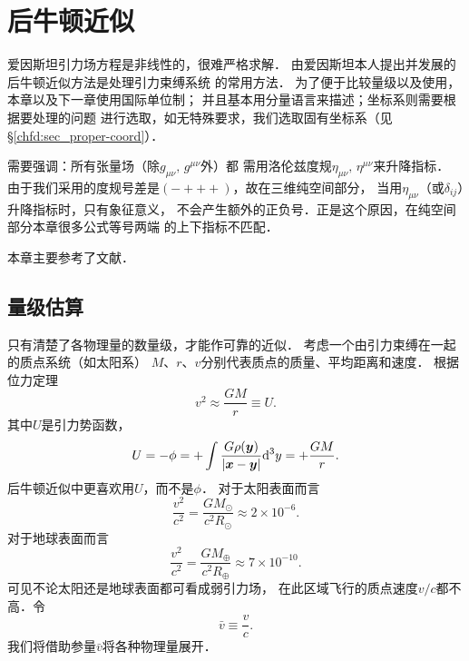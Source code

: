 
\chapter{后牛顿近似} \label{chppn}
爱因斯坦引力场方程是非线性的，很难严格求解．
由爱因斯坦本人提出并发展的后牛顿近似方法是处理引力束缚系统
的常用方法．
为了便于比较量级以及使用，本章以及下一章使用国际单位制；
并且基本用分量语言来描述；坐标系则需要根据要处理的问题
进行选取，如无特殊要求，我们选取固有坐标系（见\S\ref{chfd:sec_proper-coord}）．

需要强调：所有张量场（除$g_{\mu\nu},\, g^{\mu\nu}$外）都
需用洛伦兹度规$\eta_{\mu\nu},\, \eta^{\mu\nu}$来升降指标．
由于我们采用的度规号差是$(-+++)$，故在三维纯空间部分，
当用$\eta_{\mu\nu}$（或$\delta_{ij}$）升降指标时，只有象征意义，
不会产生额外的正负号．正是这个原因，在纯空间部分本章很多公式等号两端
的上下指标不匹配．

本章主要参考了文献\parencite[Ch. 9]{weinberg_grav-1972}．

\section{量级估算}
只有清楚了各物理量的数量级，才能作可靠的近似．
考虑一个由引力束缚在一起的质点系统（如太阳系）
$M$、$r$、$v$分别代表质点的质量、平均距离和速度．
根据位力定理
\begin{equation}
    v^2 \approx \frac{GM}{r} \equiv U .
\end{equation}
其中$U$是引力势函数，
\begin{equation}
    U = -\phi = +\int \frac{G \rho(\boldsymbol{y})}{|\boldsymbol{x}-\boldsymbol{y}|} {\rm d}^3y
      = +\frac{G M }{r} .
\end{equation}
后牛顿近似中更喜欢用$U$，而不是$\phi$．
对于太阳表面而言
\begin{equation}
    \frac{v^2}{c^2}=\frac{G M_{\odot} }{c^2 R_{\odot}} \approx 2 \times 10^{-6} .
\end{equation}
对于地球表面而言
\begin{equation}
    \frac{v^2}{c^2}=\frac{G M_{\oplus} }{c^2 R_{\oplus}} \approx 7 \times 10^{-10} .
\end{equation}
可见不论太阳还是地球表面都可看成弱引力场，
在此区域飞行的质点速度$v/c$都不高．令
\begin{equation}\label{chppn:eqn_vdc}
    \bar{v}\equiv \frac{v}{c}.
\end{equation}
我们将借助参量$\bar{v}$将各种物理量展开．

